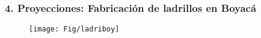 \documentclass[10pt]{beamer}
\begin{document}
\begin{frame}
\frametitle{4. Proyecciones: Fabricación de ladrillos en Boyacá}

\begin{flushleft}
{\tiny }
 \end{flushleft} 

\begin{figure}
\texttt{[image: Fig/ladriboy]}
\centering
  \label{fig:ejemplo}  
\end{figure}
\end{frame}
%
%
%
%
%
%
%
%
%
%
%
\end{document}
